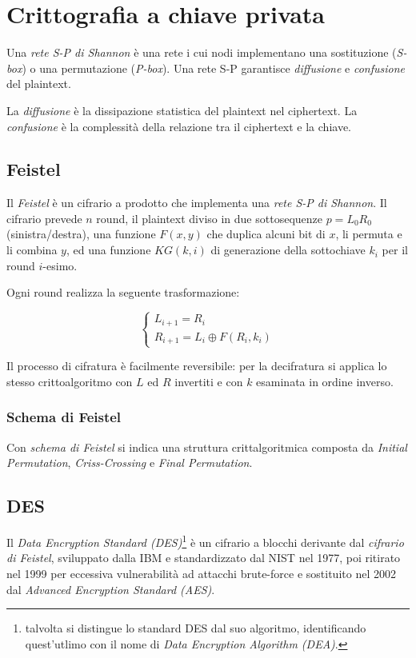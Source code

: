 \chapter{Crittografia a chiave privata}
\label{chp:private-key-cryptography}

Una \textit{rete S-P di Shannon} è una rete i cui nodi implementano una sostituzione (\textit{S-box}) o una permutazione (\textit{P-box}). Una rete S-P garantisce \textit{diffusione} e \textit{confusione} del plaintext.

La \textit{diffusione} è la dissipazione statistica del plaintext nel ciphertext.
La \textit{confusione} è la complessità della relazione tra il ciphertext e la chiave.

\section{Feistel}
Il \textit{Feistel} è un cifrario a prodotto che implementa una \textit{rete S-P di Shannon}.
Il cifrario prevede $n$ round, il plaintext diviso in due sottosequenze $p=L_{0}R_{0}$ (sinistra/destra), una funzione $F(x,y)$ che duplica alcuni bit di $x$, li permuta e li combina $y$, ed una funzione $KG(k,i)$ di generazione della sottochiave $k_{i}$ per il round $i$-esimo.

Ogni round realizza la seguente trasformazione:

$$
\begin{cases}
  L_{i+1}=R_{i}\\
  R_{i+1}=L_{i} \oplus F(R_{i},k_{i})
\end{cases}
$$

Il processo di cifratura è facilmente reversibile: per la decifratura si applica lo stesso crittoalgoritmo con $L$ ed $R$ invertiti e con $k$ esaminata in ordine inverso.


\subsection{Schema di Feistel}
Con \textit{schema di Feistel} si indica una struttura crittalgoritmica composta da \textit{Initial Permutation}, \textit{Criss-Crossing} e \textit{Final Permutation}.

\section{DES}
Il \textit{Data Encryption Standard (DES)}\footnote{talvolta si distingue lo standard DES dal suo algoritmo, identificando quest'utlimo con il nome di \textit{Data Encryption Algorithm (DEA)}.} è un cifrario a blocchi derivante dal \textit{cifrario di Feistel}, sviluppato dalla IBM e standardizzato dal NIST nel 1977, poi ritirato nel 1999 per eccessiva vulnerabilità ad attacchi brute-force e sostituito nel 2002 dal \textit{Advanced Encryption Standard (AES)}.

